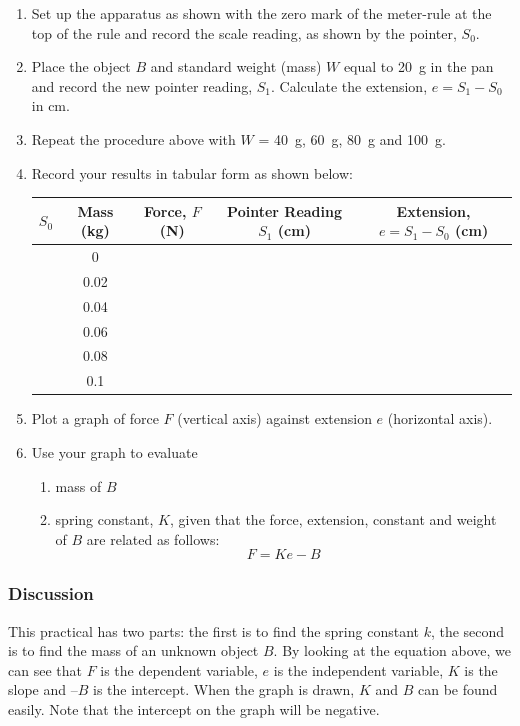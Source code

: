\begin{enumerate}
\item{Set up the apparatus as shown with the zero mark of the meter-rule at the top
of the rule and record the scale reading, as shown by the pointer, $S_0$.}
\item{Place the object $B$ and standard weight (mass) $W$ equal to 20~g in the pan
and record the new pointer reading, $S_1$. Calculate the extension, $e = S_1 - S_0$ in
cm.}
\item{Repeat the procedure above with $W$ = 40~g, 60~g, 80~g and 100~g.}
\item{Record your results in tabular form as shown below:

\begin{center}
\begin{tabular}{ | c | c | c | c | c | }
\hline
$S_0$ & Mass (kg) & Force, $F$ (N) & Pointer Reading $S_1$ (cm) & Extension, $e = S_1 - S_0$ (cm) \\ \hline
& 0 & & & \\ \hline
& 0.02 & & & \\ \hline
& 0.04 & & & \\ \hline
& 0.06 & & & \\ \hline
& 0.08 & & & \\ \hline
& 0.1 & & & \\ \hline
\end{tabular}
\end{center}

}%
\item{Plot a graph of force $F$ (vertical axis) against extension $e$ (horizontal axis).}
\item{Use your graph to evaluate
\begin{enumerate}
\item{mass of $B$}
\item{spring constant, $K$, given that the force, extension, constant and
weight of $B$ are related as follows: $$F = Ke - B$$}
\end{enumerate}
}%
\end{enumerate}

\subsubsection{Discussion}

This practical has two parts: the first is to find the spring constant $k$, the second is
to find the mass of an unknown object $B$. By looking at the equation above, we
can see that $F$ is the dependent variable, $e$ is the independent variable, $K$ is the slope and
$–B$ is the intercept. When the graph is drawn, $K$ and $B$ can be found easily. Note that the
intercept on the graph will be negative.

